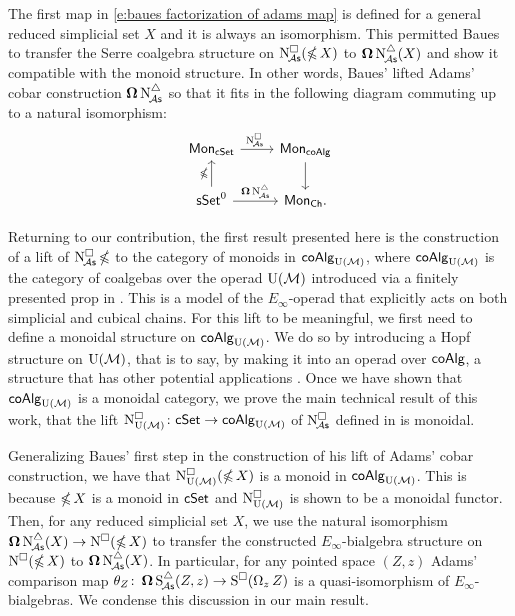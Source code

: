 The first map in \eqref{e:baues factorization of adams map} is defined for a general reduced simplicial set $X$ and it is always an isomorphism.
This permitted Baues to transfer the Serre coalgebra structure on $\cchainsA(\ccobar X)$ to $\cobar \schainsA(X)$ and show it compatible with the monoid structure.
In other words, Baues' lifted Adams' cobar construction $\cobar \schainsA$ so that it fits in the following diagram commuting up to a natural isomorphism:
\[
\begin{tikzcd}
\Mon_{\cSet} \arrow[r, "\cchainsA \ "] & \Mon_{\coAlg} \arrow[d] \\
\sSet^0 \arrow[r, "\cobar \schainsA"] \arrow[u, "\ccobar"] & \Mon_{\Ch}.
\end{tikzcd}
\]

Returning to our contribution, the first result presented here is the construction of a lift of $\cchainsA \ccobar$ to the category of monoids in $\coAlg_\UM$, where $\coAlg_\UM$ is the category of coalgebas over the operad $\UM$ introduced via a finitely presented prop in \cite{medina2020prop1}.
This is a model of the $E_\infty$-operad that explicitly acts on both simplicial and cubical chains.
For this lift to be meaningful, we first need to define a monoidal structure on $\coAlg_\UM$.
We do so by introducing a Hopf structure on $\UM$, that is to say, by making it into an operad over $\coAlg$, a structure that has other potential applications \cite{livernet2008hopf}.
Once we have shown that $\coAlg_\UM$ is a monoidal category, we prove the main technical result of this work, that the lift $\cchainsUM \colon \cSet \to \coAlg_\UM$ of $\cchainsA$ defined in \cite{medina2021cubical} is monoidal.


Generalizing Baues' first step in the construction of his lift of Adams' cobar construction, we have that $\cchainsUM(\ccobar X)$ is a monoid in $\coAlg_\UM$.
This is because $\ccobar X$ is a monoid in $\cSet$ and $\cchainsUM$ is shown to be a monoidal functor.
Then, for any reduced simplicial set $X$, we use the natural isomorphism $\cobar \schainsA(X) \to \cchains(\ccobar X)$ to transfer the constructed $E_{\infty}$-bialgebra structure on $\cchains(\ccobar X)$ to $\cobar \schainsA(X)$.
In particular, for any pointed space $(Z,z)$ Adams' comparison map $\theta_Z \colon \cobar \sSchainsA(Z,z) \to \cSchains(\loops_z Z)$ is a quasi-isomorphism of $E_{\infty}$-bialgebras.
We condense this discussion in our main result.


